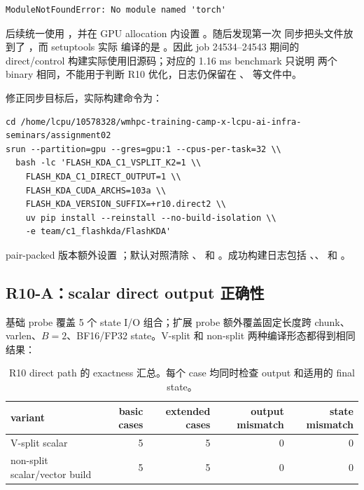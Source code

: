 \begin{lstlisting}
ModuleNotFoundError: No module named 'torch'
\end{lstlisting}

后续统一使用 ，并在
GPU allocation 内设置 。随后发现第一次
同步把头文件放到了 ，而 setuptools 实际
编译的是 。因此 job 24534--24543
期间的 direct/control 构建实际使用旧源码；对应的 1.16 ms benchmark 只说明
两个 binary 相同，不能用于判断 R10 优化，日志仍保留在
、
等文件中。

修正同步目标后，实际构建命令为：

\begin{lstlisting}
cd /home/lcpu/10578328/wmhpc-training-camp-x-lcpu-ai-infra-seminars/assignment02
srun --partition=gpu --gres=gpu:1 --cpus-per-task=32 \\
  bash -lc 'FLASH_KDA_C1_VSPLIT_K2=1 \\
    FLASH_KDA_C1_DIRECT_OUTPUT=1 \\
    FLASH_KDA_CUDA_ARCHS=103a \\
    FLASH_KDA_VERSION_SUFFIX=+r10.direct2 \\
    uv pip install --reinstall --no-build-isolation \\
    -e team/c1_flashkda/FlashKDA'
\end{lstlisting}

pair-packed 版本额外设置
；默认对照清除
、
和 。成功构建日志包括
、、
 和
。

\subsection{R10-A：scalar direct output 正确性}

基础 probe  覆盖 5 个 state I/O 组合；扩展
probe 额外覆盖固定长度跨 chunk、varlen、\(B=2\)、BF16/FP32 state。V-split
和 non-split 两种编译形态都得到相同结果：

\begin{table}[htbp]
\centering
\small
\begin{tabular}{l r r r r}
\toprule
variant & basic cases & extended cases & output mismatch & state mismatch \\
\midrule
V-split scalar & 5 & 5 & 0 & 0 \\
non-split scalar/vector build & 5 & 5 & 0 & 0 \\
\bottomrule
\end{tabular}
\caption{R10 direct path 的 exactness 汇总。每个 case 均同时检查 output 和适用的 final state。}
\end{table}

